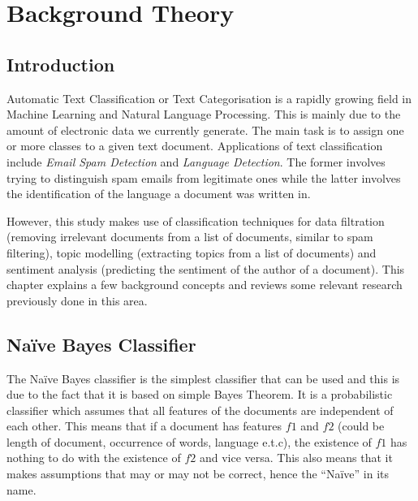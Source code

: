 
\chapter{Background Theory}

\label{ch:background}

\section{Introduction}
\label{sec:background-introduction}

Automatic Text Classification or Text Categorisation is a rapidly growing field in Machine Learning
and Natural Language Processing. This is mainly due to the amount of electronic data we currently
generate. The main task is to assign one or more classes to a given text document. Applications of
text classification include \textit{Email Spam Detection} and \textit{Language
Detection}. The former involves trying to distinguish spam emails from legitimate ones while the
latter involves the identification of the language a document was written in.

However, this study makes use of classification techniques for data filtration (removing irrelevant
documents from a list of documents, similar to spam filtering), topic modelling (extracting topics
from a list of documents) and sentiment analysis (predicting the sentiment of the author of a
document). This chapter explains a few background concepts and reviews some relevant research
previously done in this area.

\section{Na\"{i}ve Bayes Classifier}
\label{sec:bg-naive-bayes}
The Na\"{i}ve Bayes classifier is the simplest classifier that can be used and this is due to the
fact that it is based on simple Bayes Theorem. It is a probabilistic classifier which assumes that
all features of the documents are independent of each other. This means that if a document has
features $f1$ and $f2$ (could be length of document, occurrence of words, language e.t.c), the
existence of $f1$ has nothing to do with the existence of $f2$ and vice versa. This also means that
it makes assumptions that may or may not be correct, hence the ``Na\"{i}ve'' in its name.

